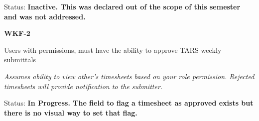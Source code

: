 \noindent Status: \textbf{Inactive.  This was declared out of the scope of this semester and was not addressed.}\\

\noindent 

\noindent \textbf{WKF-2}

\noindent Users with permissions, must have the ability to approve TARS weekly submittals

\noindent \textit{Assumes ability to view other's timesheets based on your role permission. Rejected timesheets will provide notification to the submitter.}

\noindent Status: \textbf{In Progress.  The field to flag a timesheet as approved exists but there is no visual way to set that flag.}
